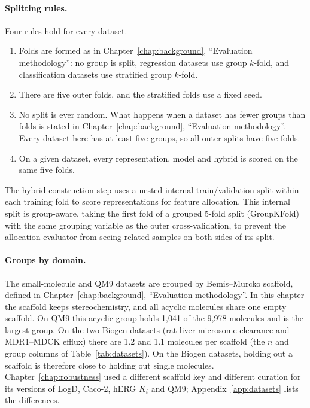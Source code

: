 \paragraph{Splitting rules.} Four rules hold for every dataset.
\begin{enumerate}[leftmargin=*]
    \item Folds are formed as in Chapter~\ref{chap:background}, ``Evaluation methodology'': no group is split, regression datasets use group $k$-fold, and classification datasets use stratified group $k$-fold.
    \item There are five outer folds, and the stratified folds use a fixed seed.
    \item No split is ever random. What happens when a dataset has fewer groups than folds is stated in Chapter~\ref{chap:background}, ``Evaluation methodology''. Every dataset here has at least five groups, so all outer splits have five folds.
    \item On a given dataset, every representation, model and hybrid is scored on the same five folds.
\end{enumerate}

The hybrid construction step uses a nested internal train/validation split within each training fold to score representations for feature allocation. This internal split is group-aware, taking the first fold of a grouped 5-fold split (GroupKFold) with the same grouping variable as the outer cross-validation, to prevent the allocation evaluator from seeing related samples on both sides of its split.

\paragraph{Groups by domain.} The small-molecule and QM9 datasets are grouped by Bemis--Murcko scaffold, defined in Chapter~\ref{chap:background}, ``Evaluation methodology''. In this chapter the scaffold keeps stereochemistry, and all acyclic molecules share one empty scaffold. On QM9 this acyclic group holds 1,041 of the 9,978 molecules and is the largest group. On the two Biogen datasets (rat liver microsome clearance and MDR1--MDCK efflux) there are 1.2 and 1.1 molecules per scaffold (the $n$ and group columns of Table~\ref{tab:datasets}). On the Biogen datasets, holding out a scaffold is therefore close to holding out single molecules. Chapter~\ref{chap:robustness} used a different scaffold key and different curation for its versions of LogD, Caco-2, hERG $K_i$ and QM9; Appendix~\ref{app:datasets} lists the differences.

